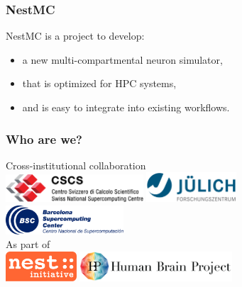 \documentclass[aspectratio=43,12pt]{beamer}
\author{Sam Yates, CSCS}
\title{\nestmc}
\subtitle{A new multi-compartment neuron simulator}
\date{\today}
\newcommand{\nestmc}{NestMC}
\begin{document}
\cscstitle

\begin{frame}
\frametitle{\nestmc}
\vfill
\nestmc{} is a project to develop:

\vfill
\begin{itemize}
\item a new multi-compartmental neuron simulator,
\item that is optimized for HPC systems,
\item and is easy to integrate into existing workflows.
\end{itemize}
\vfill

\end{frame}

\begin{frame}
\frametitle{Who are we?}
\centering 
\vspace{1ex}
{\large Cross-institutional collaboration}\\[2ex]
\includegraphics[height=2.8em]{logos/cscs_logo.pdf}
\hspace{15mm}
\includegraphics[height=3em]{logos/julich_logo.pdf}
\hspace*{5mm}
\\[1.4em]
\includegraphics[height=2.9em]{logos/bsc_logo.pdf}\\

\vfill
{\large As part of}\\[2ex]
\includegraphics[height=3em]{logos/nest-initiative.pdf}
\hspace{15mm}
\includegraphics[height=3em]{logos/HBP_logo.jpg}

\vspace*{1em}
\end{frame}
\end{document}
